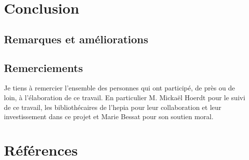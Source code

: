 \documentclass[a4paper, 12pt]{article}
\begin{document}
\section{Conclusion}
\subsection{Remarques et améliorations}
\subsection{Remerciements}
Je tiens à remercier l'ensemble des personnes qui ont participé, de près ou de loin, à l'élaboration de ce travail. En
particulier M. Mickaël Hoerdt pour le suivi de ce travail, les bibliothécaires de l'hepia pour leur collaboration et
leur investissement dans ce projet et Marie Bessat pour son soutien moral.

\section{Références}


\end{document}
